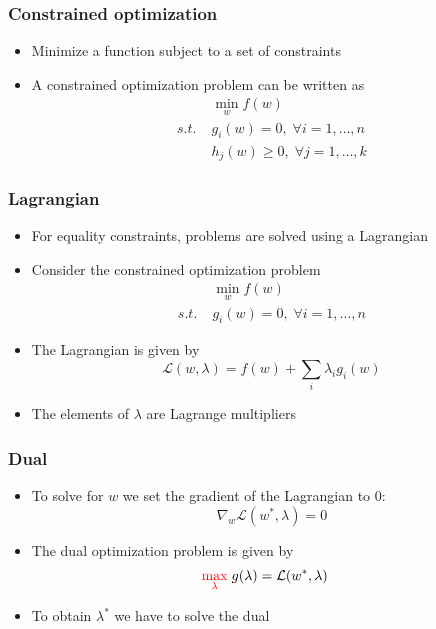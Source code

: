\documentclass[10pt]{beamer}
\begin{document}
\begin{frame}
  \frametitle{Constrained optimization}
  \begin{itemize}
    \item Minimize a function subject to a set of {\color{red} constraints}
	\item A constrained optimization problem can be written as
	\begin{align*}
	& \min_w f(w)\\
	s.t. \; & g_i(w) = 0, \; \forall i = 1,\ldots,n\\
	 & h_j(w) \geq 0, \; \forall j = 1,\ldots,k
	\end{align*}
  \end{itemize}
\end{frame}

\begin{frame}
  \frametitle{Lagrangian}
  \begin{itemize}
    \item For {\color{red} equality constraints}, problems are solved using a {\color{red} Lagrangian}
	\item Consider the constrained optimization problem
	\begin{align*}
	& \min_w f(w)\\
	s.t. \; & g_i(w) = 0, \; \forall i = 1,\ldots,n
	\end{align*}
	\item The Lagrangian is given by
	\[\mathcal{L}(w,\lambda) = f(w) + \sum_i \lambda_i g_i(w)\]
	\item The elements of $\lambda$ are {\color{blue} Lagrange multipliers}
  \end{itemize}
\end{frame}

\begin{frame}
  \frametitle{Dual}
  \begin{itemize}
    \item To solve for $w$ we set the gradient of the Lagrangian to $0$:
	\[\nabla_w \mathcal{L}(w^*,\lambda) = 0\]
	\item The {\color{blue} dual optimization problem} is given by
	\begin{align*}
	& {\color{red} \max_{\lambda}} \; g(\lambda) = \mathcal{L}(w^*,\lambda)
	\end{align*}
	\item To obtain $\lambda^*$ we have to solve the dual
  \end{itemize}
\end{frame}
\end{document}
